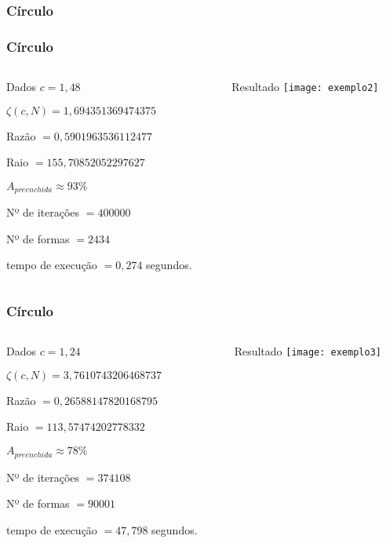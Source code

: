\documentclass[aspectratio=169,11pt,red]{beamer}
\begin{document}
\subsubsection{Círculo}

\begin{frame}
\frametitle{Círculo}
\begin{columns}[T]
\begin{column}{.5\textwidth}
\begin{block}{\centering Dados}
$c=1,48$
\smallskip

$\zeta(c,N)=1,694351369474375$
\smallskip

Razão $=0,5901963536112477$
\smallskip

Raio $=155,70852052297627$
\smallskip

$A_{preenchida} \approx 93\%$
\smallskip

Nº de iterações $=400000$
\smallskip

Nº de formas $=2434$
\smallskip

tempo de execução $= 0,274$ segundos.
\smallskip
\end{block}
\end{column}

\begin{column}{.5\textwidth}
\begin{block}{\centering Resultado}
\centering
\texttt{[image: exemplo2]}
\end{block}
\end{column}
\end{columns}
\end{frame}

\begin{frame}
\frametitle{Círculo}

\begin{columns}[T]
\begin{column}{.5\textwidth}
\begin{block}{\centering Dados}
$c=1,24$
\smallskip

$\zeta(c,N)=3,7610743206468737$
\smallskip

Razão $=0,26588147820168795$
\smallskip

Raio $=113,57474202778332$
\smallskip

$A_{preenchida} \approx 78\%$
\smallskip

Nº de iterações $=374108$
\smallskip

Nº de formas $=90001$
\smallskip

tempo de execução $= 47,798$ segundos.
\smallskip
\end{block}
\end{column}

\begin{column}{.5\textwidth}
\begin{block}{\centering Resultado}
\centering
\texttt{[image: exemplo3]}
\end{block}
\end{column}
\end{columns}

\end{frame}
\end{document}
